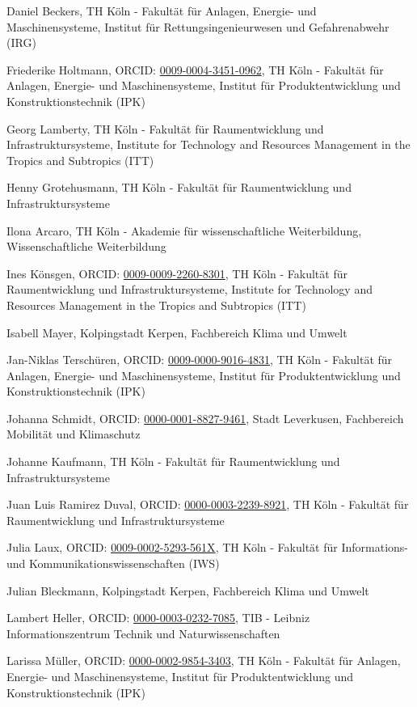 Daniel Beckers, TH Köln - Fakultät für Anlagen, Energie- und
Maschinensysteme, Institut für Rettungsingenieurwesen und Gefahrenabwehr
(IRG)

Friederike Holtmann, ORCID:
\href{https://orcid.org/0009-0004-3451-0962}{0009-0004-3451-0962}, TH
Köln - Fakultät für Anlagen, Energie- und Maschinensysteme, Institut für
Produktentwicklung und Konstruktionstechnik (IPK)

Georg Lamberty, TH Köln - Fakultät für Raumentwicklung und
Infrastruktursysteme, Institute for Technology and Resources Management
in the Tropics and Subtropics (ITT)

Henny Grotehusmann, TH Köln - Fakultät für Raumentwicklung und
Infrastruktursysteme

Ilona Arcaro, TH Köln - Akademie für wissenschaftliche Weiterbildung,
Wissenschaftliche Weiterbildung

Ines Könsgen, ORCID:
\href{https://orcid.org/0009-0009-2260-8301}{0009-0009-2260-8301}, TH
Köln - Fakultät für Raumentwicklung und Infrastruktursysteme, Institute
for Technology and Resources Management in the Tropics and Subtropics
(ITT)

Isabell Mayer, Kolpingstadt Kerpen, Fachbereich Klima und Umwelt

Jan-Niklas Terschüren, ORCID:
\href{https://orcid.org/0009-0000-9016-4831}{0009-0000-9016-4831}, TH
Köln - Fakultät für Anlagen, Energie- und Maschinensysteme, Institut für
Produktentwicklung und Konstruktionstechnik (IPK)

Johanna Schmidt, ORCID:
\href{https://orcid.org/0000-0001-8827-9461}{0000-0001-8827-9461}, Stadt
Leverkusen, Fachbereich Mobilität und Klimaschutz

Johanne Kaufmann, TH Köln - Fakultät für Raumentwicklung und
Infrastruktursysteme

Juan Luis Ramirez Duval, ORCID:
\href{https://orcid.org/0000-0003-2239-8921}{0000-0003-2239-8921}, TH
Köln - Fakultät für Raumentwicklung und Infrastruktursysteme

Julia Laux, ORCID:
\href{https://orcid.org/0009-0002-5293-561X}{0009-0002-5293-561X}, TH
Köln - Fakultät für Informations- und Kommunikationswissenschaften (IWS)

Julian Bleckmann, Kolpingstadt Kerpen, Fachbereich Klima und Umwelt

Lambert Heller, ORCID:
\href{https://orcid.org/0000-0003-0232-7085}{0000-0003-0232-7085}, TIB -
Leibniz Informationszentrum Technik und Naturwissenschaften

Larissa Müller, ORCID:
\href{https://orcid.org/0000-0002-9854-3403}{0000-0002-9854-3403}, TH
Köln - Fakultät für Anlagen, Energie- und Maschinensysteme, Institut für
Produktentwicklung und Konstruktionstechnik (IPK)

